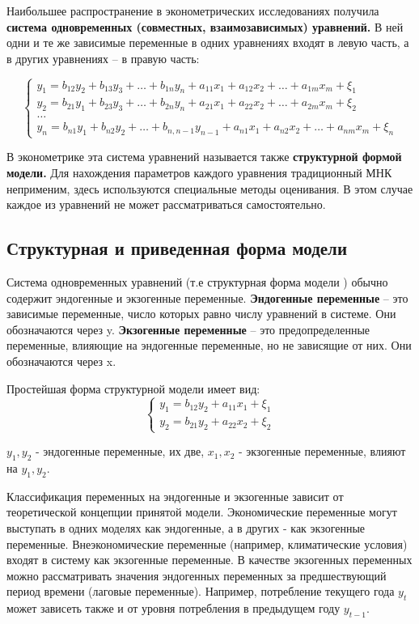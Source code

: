 \documentclass[aps,%
12pt,%
final,%
oneside,
onecolumn,%
musixtex, %
superscriptaddress,%
centertags]{article} %
\begin{document}
Наибольшее распространение в эконометрических исследованиях получила \textbf{система одновременных (совместных, взаимозависимых) уравнений.} В ней одни и те же зависимые переменные в одних уравнениях входят в левую часть, а в других уравнениях – в правую часть:

$$\left \{
\begin{matrix}
	y_1 = b_{12}y_2 + b_{13}y_3 + \ldots + b_{1n}y_n +  a_{11}x_1 + a_{12}x_2 + \ldots + a_{1m}x_m + \xi_1 \\[0.3cm]
	y_2 =b_{21}y_1 + b_{23}y_3 + \ldots + b_{2n}y_n + a_{21}x_1 + a_{22}x_2 + \ldots + a_{2m}x_m + \xi_2  \\[0.3cm]
	\ldots \\
	y_n = b_{n1}y_1 + b_{n2}y_2 + \ldots + b_{n,n-1}y_{n-1} + a_{n1}x_1 + a_{n2}x_2 + \ldots + a_{nm}x_m + \xi_n 
\end{matrix}
\right.
$$

В эконометрике эта система уравнений называется также \textbf{структурной формой модели.} Для нахождения параметров каждого уравнения традиционный МНК неприменим, здесь используются специальные методы оценивания. В этом случае каждое из уравнений не может рассматриваться самостоятельно.

\subsection{Структурная и приведенная форма модели}

Система одновременных уравнений (т.е структурная форма модели ) обычно содержит эндогенные и экзогенные переменные.
\textbf{Эндогенные переменные} – это зависимые переменные, число которых равно числу уравнений в системе. Они обозначаются через y.
\textbf{Экзогенные переменные} – это предопределенные переменные, влияющие на эндогенные переменные, но не зависящие от них. Они обозначаются через x.

Простейшая форма структурной модели имеет вид:
$$\left \{
\begin{matrix}
	y_1 = b_{12}y_2 + a_{11}x_1 + \xi_1\\
	y_2 = b_{21}y_2 + a_{22}x_2 + \xi_2
\end{matrix}
\right.
$$

$y_1,y_2$ - эндогенные переменные, их две,  $x_1,x_2$ - экзогенные переменные, влияют на $y_1, y_2$.

Классификация переменных на эндогенные и экзогенные зависит от теоретической концепции принятой модели. Экономические
переменные могут выступать в одних моделях как эндогенные, а в других - как экзогенные переменные. Внеэкономические переменные (например, климатические условия) входят в систему как экзогенные переменные. В качестве экзогенных переменных можно рассматривать значения эндогенных переменных за предшествующий период времени (лаговые переменные). Например, потребление текущего года $y_t$ может зависеть также и от уровня потребления в предыдущем году $y_{t-1}$.
\end{document}

